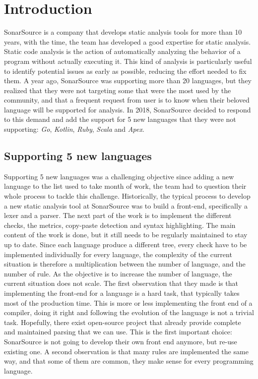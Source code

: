 \section{Introduction}
\label{sec:introduction}
SonarSource is a company that develops static analysis tools for more than 10 years, with the time, the team has developed a good expertise for static analysis.
Static code analysis is the action of automatically analyzing the behavior of a program without actually executing it.
This kind of analysis is particularly useful to identify potential issues as early as possible, reducing the effort needed to fix them.
A year ago, SonarSource was supporting more than 20 languages, but they realized that they were not targeting some that were the most used by the community, and that a frequent request from user is to know when their beloved language will be supported for analysis. 
In 2018, SonarSource decided to respond to this demand and add the support for 5 new languages that they were not supporting: \emph{Go}, \emph{Kotlin}, \emph{Ruby}, \emph{Scala} and \emph{Apex}.

\subsection{Supporting 5 new languages}
\label{subsec:5_new_languages}
Supporting 5 new languages was a challenging objective since adding a new language to the list used to take month of work, the team had to question their whole process to tackle this challenge.
Historically, the typical process to develop a new static analysis tool at SonarSource was to build a front-end, specifically a lexer and a parser.
The next part of the work is to implement the different checks, the metrics, copy-paste detection and syntax highlighting. The main content of the work is done, but it still needs to be regularly maintained to stay up to date.
Since each language produce a different tree, every check have to be implemented individually for every language, the complexity of the current situation is therefore a multiplication between the number of language, and the number of rule. 
As the objective is to increase the number of language, the current situation does not scale.
The first observation that they made is that implementing the front-end for a language is a hard task, that typically takes most of the production time. This is more or less implementing the front end of a compiler, doing it right and following the evolution of the language is not a trivial task.
Hopefully, there exist open-source project that already provide complete and maintained parsing that we can use. 
This is the first important choice: SonarSource is not going to develop their own front end anymore, but re-use existing one.
A second observation is that many rules are implemented the same way, and that some of them are common, they make sense for every programming language.


